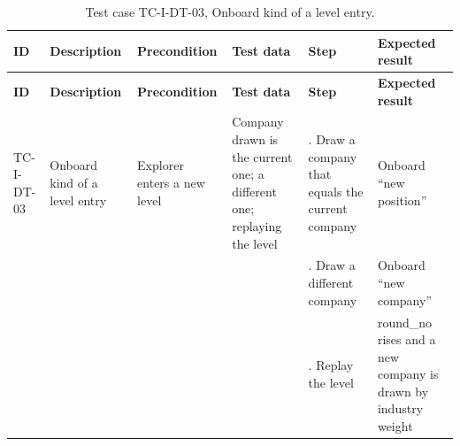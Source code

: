 {\footnotesize{}\renewcommand{\arraystretch}{1.1}
\begin{longtable}{|>{\raggedright\arraybackslash}p{}|>{\raggedright\arraybackslash}p{}|>{\raggedright\arraybackslash}p{}|>{\raggedright\arraybackslash}p{}|>{\raggedright\arraybackslash}p{}|>{\raggedright\arraybackslash}p{}|}
\caption{Test case TC-I-DT-03, Onboard kind of a level entry.} \\
\hline
\textbf{ID} & \textbf{Description} & \textbf{Precondition} & \textbf{Test data} & \textbf{Step} & \textbf{Expected result} \\ \hline
\endfirsthead
\hline
\textbf{ID} & \textbf{Description} & \textbf{Precondition} & \textbf{Test data} & \textbf{Step} & \textbf{Expected result} \\ \hline
\endhead
TC-I-DT-03 & Onboard kind of a level entry & Explorer enters a new level & Company drawn is the current one; a different one; replaying the level & 1. Draw a company that equals the current company & Onboard ``new position'' \\ \cline{5-6}
 &  &  &  & 2. Draw a different company & Onboard ``new company'' \\ \cline{5-6}
 &  &  &  & 3. Replay the level & round\_no rises and a new company is drawn by industry weight \\ \hline
\end{longtable}
}

